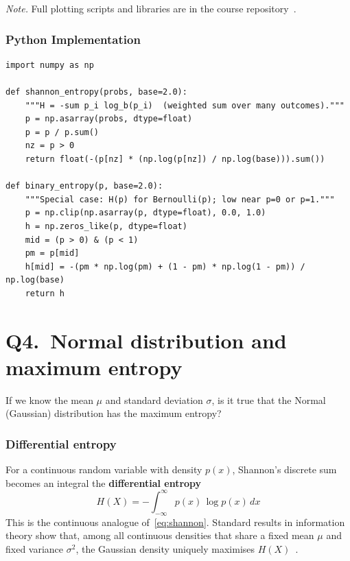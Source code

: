 \documentclass[12pt,a4paper]{article}
\begin{document}
\noindent\textit{Note.} Full plotting scripts and libraries are in the course
repository~\cite{CourseRepo}.


\subsubsection*{Python Implementation}
\par\medskip
\noindent\begin{minipage}{\linewidth}
\begin{lstlisting}[caption={Shannon entropy and binary entropy}]
import numpy as np

def shannon_entropy(probs, base=2.0):
    """H = -sum p_i log_b(p_i)  (weighted sum over many outcomes)."""
    p = np.asarray(probs, dtype=float)
    p = p / p.sum()
    nz = p > 0
    return float(-(p[nz] * (np.log(p[nz]) / np.log(base))).sum())

def binary_entropy(p, base=2.0):
    """Special case: H(p) for Bernoulli(p); low near p=0 or p=1."""
    p = np.clip(np.asarray(p, dtype=float), 0.0, 1.0)
    h = np.zeros_like(p, dtype=float)
    mid = (p > 0) & (p < 1)
    pm = p[mid]
    h[mid] = -(pm * np.log(pm) + (1 - pm) * np.log(1 - pm)) / np.log(base)
    return h
\end{lstlisting}
\end{minipage}

\clearpage
\section*{Q4.\ Normal distribution and maximum entropy}

If we know the mean \(\mu\) and standard deviation \(\sigma\), is it true that
the Normal (Gaussian) distribution has the maximum entropy?

\subsubsection*{Differential entropy}

For a continuous random variable with density \(p(x)\), Shannon's discrete
sum becomes an integral the \textbf{differential entropy}
\begin{equation}
  H(X) = -\int_{-\infty}^{\infty} p(x)\,\log p(x)\,dx
  \label{eq:diffent}
\end{equation}
This is the continuous
analogue of~\eqref{eq:shannon}. Standard results in information theory show
that, among all continuous densities that share a fixed mean \(\mu\) and
fixed variance \(\sigma^2\), the Gaussian density uniquely maximises
\(H(X)\)~\cite{Blahut2002}.
\end{document}
